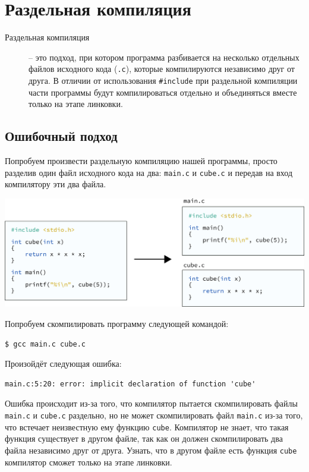 \documentclass{article}
\begin{document}
\section{Раздельная компиляция}
\begin{description}
\item[Раздельная компиляция] -- это подход, при котором программа разбивается на несколько отдельных файлов исходного кода (\texttt{.c}), которые компилируются независимо друг от друга. В отличии от использования \texttt{\#include} при раздельной компиляции части программы будут компилироваться отдельно и объединяться вместе только на этапе линковки. 
\end{description}

\subsection*{Ошибочный подход}
Попробуем произвести раздельную компиляцию нашей программы, просто разделив один файл исходного кода на два: \texttt{main.c} и \texttt{cube.c} и передав на вход компилятору эти два файла.
\begin{center}
\includegraphics[scale=0.85]{../images/04main_cube_separate1.png}
\end{center}
Попробуем скомпилировать программу следующей командой:
\begin{lstlisting}[style=csMiptBash]
$ gcc main.c cube.c
\end{lstlisting}
Произойдёт следующая ошибка:
\begin{verbatim}
main.c:5:20: error: implicit declaration of function 'cube'
\end{verbatim}
Ошибка происходит из-за того, что компилятор пытается скомпилировать файлы \texttt{main.c} и \texttt{cube.c} раздельно, но не может скомпилировать файл \texttt{main.c} из-за того, что встечает неизвестную ему функцию \texttt{cube}. Компилятор не знает, что такая функция существует в другом файле, так как он должен скомпилировать два файла независимо друг от друга. Узнать, что в другом файле есть функция \texttt{cube} компилятор сможет только на этапе линковки.
\end{document}
